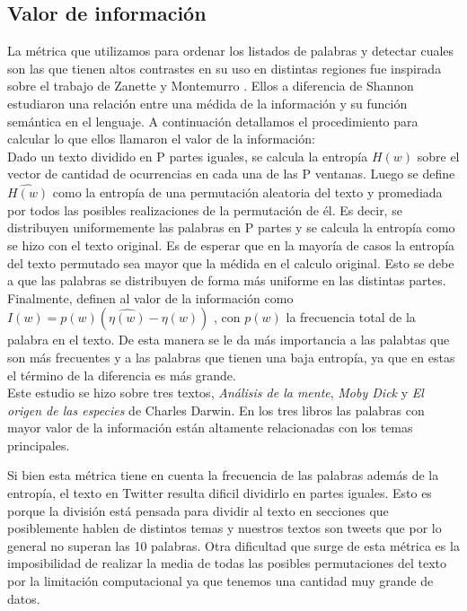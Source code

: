 \subsection{Valor de información}
La métrica que utilizamos para ordenar los listados de palabras y detectar cuales son
las que tienen altos contrastes en su uso en distintas regiones fue inspirada sobre el
trabajo de Zanette y Montemurro \cite{montemurro2010towards}.
Ellos a diferencia de Shannon estudiaron una relación entre una médida de la información y su función semántica en el lenguaje.
A continuación detallamos el procedimiento para calcular lo que ellos llamaron
el valor de la información: \\
Dado un texto dividido en P partes iguales, se calcula la entropía  $H(w)$ sobre el vector de cantidad de ocurrencias en cada una de las P ventanas.
Luego se define $\widehat{H(w)}$  como la entropía de una permutación aleatoria del texto y promediada por todos las posibles realizaciones de la permutación de él. 
Es decir, se distribuyen uniformemente las palabras en P partes y se calcula la
entropía como se hizo con el texto original. Es de esperar que en la mayoría de casos 
la entropía del texto permutado sea mayor que la médida en el calculo original. Esto 
se debe a que las palabras se distribuyen de forma más uniforme 
en las distintas partes.
Finalmente, definen al valor de la información como $I(w) = p(w) (\widehat{\eta(w)} - \eta(w))$ , con $p(w)$ la frecuencia total de la palabra en el texto. 
De esta manera se le da más importancia a las palabtas que son más frecuentes y a las palabras que tienen una baja entropía, ya que en estas el término de la diferencia es más grande.\\
Este estudio se hizo sobre tres textos, \textit{Análisis de la mente}, 
\textit{Moby Dick} y \textit{El origen de las especies} de Charles Darwin. 
En los tres libros las palabras con mayor valor de la información están 
altamente relacionadas con los temas principales.

Si bien esta métrica tiene en cuenta la frecuencia de las palabras además de la 
entropía, el texto en Twitter resulta dificil dividirlo en partes iguales. 
Esto es porque la división está pensada para dividir al texto en secciones que 
posiblemente hablen de distintos temas y nuestros textos son tweets que por lo general no superan las 10 palabras.
Otra dificultad que surge de esta métrica es la imposibilidad de realizar la media 
de todas las posibles permutaciones del texto por la limitación computacional ya que 
tenemos una cantidad muy grande de datos.

